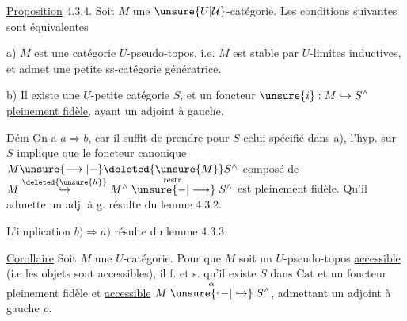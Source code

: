 
\uline{Proposition} 4.3.4. Soit $M$ une $\unsure{U|\mathcal U}$-catégorie. Les conditions suivantes sont équivalentes

a) $M$ est une catégorie $U$-pseudo-topos, i.e. $M$ est stable par $U$-limites inductives, et admet une petite ss-catégorie  génératrice.

b) Il existe une  $U$-petite catégorie $S$, et un foncteur $\unsure{i}:M\hookrightarrow S^\wedge$ \uline{pleinement fidèle}, ayant un adjoint à gauche.

\uline{Dém} On a $a\Rightarrow b$, car il suffit de prendre pour $S$  celui spécifié dans a), l'hyp. sur $S$ implique que le foncteur canonique $M\unsure{\longrightarrow|-}\deleted{\unsure{M}}S^\wedge$ composé de $M\mathrel{\mathop{\hookrightarrow}\limits^{\deleted{\unsure{h}}}}M^\wedge\mathrel{\mathop{\unsure{-|\longrightarrow}}\limits^{\mathrm{restr.}}}S^\wedge$ est pleinement fidèle. Qu'il admette un adj. à g. résulte du lemme 4.3.2.

L'implication $b)\Rightarrow a)$ résulte du lemme 4.3.3.

\uline{Corollaire}  Soit $M$ une $U$-catégorie. Pour que $M$ soit un $U$-pseudo-topos \deleted{\unsure{$\zeta|\xi$}} \uline{accessible} (i.e   les objets sont accessibles), il f. et s. qu'il existe $S$ dans $\mathrm{Cat}$ et un foncteur pleinement fidèle et \uline{accessible} $M\mathrel{\mathop{\unsure{\lhook\joinrel-|\hookrightarrow}}\limits^\alpha}S^\wedge$, admettant un adjoint à gauche $\rho$.

